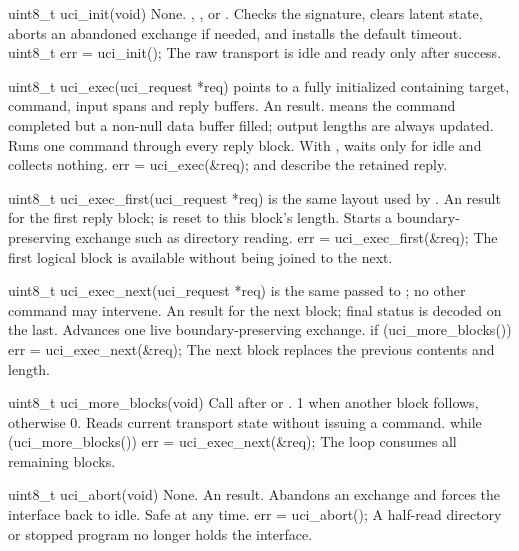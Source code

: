 \begin{referencechapter}
{uint8\_t uci\_init(void)}
{None.}
{, , or
.}
{Checks the signature, clears latent state, aborts an abandoned exchange if
needed, and installs the default timeout.}
{uint8\_t err = uci\_init();}
{The raw transport is idle and ready only after success.}

{uint8\_t uci\_exec(uci\_request *req)}
{ points to a fully initialized
\hyperref[struct:uci-request]{} containing target, command,
input spans and reply buffers.}
{An  result.  means the command
completed but a non-null data buffer filled; output lengths are always updated.}
{Runs one command through every reply block. With
, waits only for idle and collects nothing.}
{err = uci\_exec(\&req);}
{ and  describe the retained reply.}

{uint8\_t uci\_exec\_first(uci\_request *req)}
{ is the same
\hyperref[struct:uci-request]{} layout used by
.}
{An  result for the first reply block;  is
reset to this block's length.}
{Starts a boundary-preserving exchange such as directory reading.}
{err = uci\_exec\_first(\&req);}
{The first logical block is available without being joined to the next.}

{uint8\_t uci\_exec\_next(uci\_request *req)}
{ is the same
\hyperref[struct:uci-request]{} passed to
; no other command may intervene.}
{An  result for the next block; final status is decoded on the
last.}
{Advances one live boundary-preserving exchange.}
{if (uci\_more\_blocks()) err = uci\_exec\_next(\&req);}
{The next block replaces the previous contents and length.}

{uint8\_t uci\_more\_blocks(void)}
{Call after  or .}
{1 when another block follows, otherwise 0.}
{Reads current transport state without issuing a command.}
{while (uci\_more\_blocks()) err = uci\_exec\_next(\&req);}
{The loop consumes all remaining blocks.}

{uint8\_t uci\_abort(void)}
{None.}
{An  result.}
{Abandons an exchange and forces the interface back to idle. Safe at any time.}
{err = uci\_abort();}
{A half-read directory or stopped program no longer holds the interface.}


\end{referencechapter}
